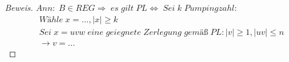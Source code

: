 \begin{proof}[Beweis]
	\begin{math}
		Ann:\;B\in REG\Rightarrow\;es\;gilt\;PL\Leftrightarrow\;Sei\;k\;Pumpingzahl:
	\end{math}
	\begin{align*}
		&Wähle\;x=...,\mid x\mid\ge k\\
		&Sei\;x=uvw\;eine\;geiegnete\;Zerlegung\;gemäß\;PL:\mid v\mid\ge1,\mid uv\mid\le n\\
		&\rightarrow v=...
	\end{align*}
\end{proof}